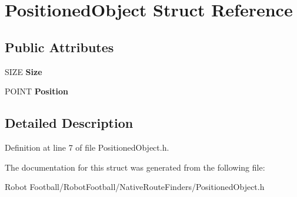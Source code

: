 \hypertarget{struct_positioned_object}{\section{Positioned\-Object Struct Reference}
\label{struct_positioned_object}
}
\subsection*{Public Attributes}
\begin{DoxyCompactItemize}
\item 
\hypertarget{struct_positioned_object_a8877e116ed984f9b900ff4775a6c5fbe}{S\-I\-Z\-E {\bfseries Size}}\label{struct_positioned_object_a8877e116ed984f9b900ff4775a6c5fbe}

\item 
\hypertarget{struct_positioned_object_a8749269d6baa4c99e7c8ae9bfb642734}{P\-O\-I\-N\-T {\bfseries Position}}\label{struct_positioned_object_a8749269d6baa4c99e7c8ae9bfb642734}

\end{DoxyCompactItemize}


\subsection{Detailed Description}


Definition at line 7 of file Positioned\-Object.\-h.



The documentation for this struct was generated from the following file\-:\begin{DoxyCompactItemize}
\item 
Robot Football/\-Robot\-Football/\-Native\-Route\-Finders/Positioned\-Object.\-h\end{DoxyCompactItemize}
